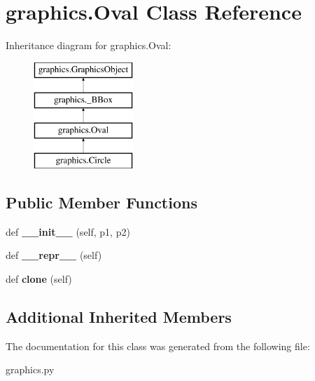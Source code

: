 \hypertarget{classgraphics_1_1_oval}{}\section{graphics.\+Oval Class Reference}
\label{classgraphics_1_1_oval}
Inheritance diagram for graphics.\+Oval\+:\begin{figure}[H]
\begin{center}
\leavevmode
\includegraphics[height=4.000000cm]{classgraphics_1_1_oval}
\end{center}
\end{figure}
\subsection*{Public Member Functions}
\begin{DoxyCompactItemize}
\item 
\mbox{\label{classgraphics_1_1_oval_ac24c500a6feba342c3459fbfe5fee794}} 
def {\bfseries \+\_\+\+\_\+init\+\_\+\+\_\+} (self, p1, p2)
\item 
\mbox{\label{classgraphics_1_1_oval_a7a3e92c1b76ffe75cbc18e49daa159ab}} 
def {\bfseries \+\_\+\+\_\+repr\+\_\+\+\_\+} (self)
\item 
\mbox{\label{classgraphics_1_1_oval_af914fb35dc36e36f1ba2f43679b8f0a1}} 
def {\bfseries clone} (self)
\end{DoxyCompactItemize}
\subsection*{Additional Inherited Members}


The documentation for this class was generated from the following file\+:\begin{DoxyCompactItemize}
\item 
graphics.\+py\end{DoxyCompactItemize}
